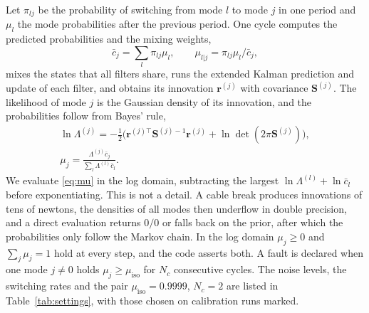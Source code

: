 \documentclass[a4paper,fleqn]{cas-dc}
\newcommand{\vc}[1]{\bm{#1}}
\newcommand{\mt}[1]{\mathbf{#1}}
\begin{document}
Let $\pi_{lj}$ be the probability of switching from mode $l$ to mode $j$ in one period and $\mu_l$ the mode probabilities after the previous period. One cycle computes the predicted probabilities and the mixing weights,
\begin{equation}\label{eq:mix}
\bar c_j=\sum_l\pi_{lj}\mu_l,\qquad\mu_{l|j}=\pi_{lj}\mu_l/\bar c_j,
\end{equation}
mixes the states that all filters share, runs the extended Kalman prediction and update of each filter, and obtains its innovation $\vc r^{(j)}$ with covariance $\mt S^{(j)}$. The likelihood of mode $j$ is the Gaussian density of its innovation, and the probabilities follow from Bayes' rule,
\begin{equation}\label{eq:mu}
\begin{gathered}
\ln\Lambda^{(j)}=-\tfrac12\big(\vc r^{(j)\top}\mt S^{(j)-1}\vc r^{(j)}+\ln\det(2\pi\mt S^{(j)})\big),\\
\mu_j=\frac{\Lambda^{(j)}\bar c_j}{\sum_l\Lambda^{(l)}\bar c_l}.
\end{gathered}
\end{equation}
We evaluate \eqref{eq:mu} in the log domain, subtracting the largest $\ln\Lambda^{(l)}+\ln\bar c_l$ before exponentiating. This is not a detail. A cable break produces innovations of tens of newtons, the densities of all modes then underflow in double precision, and a direct evaluation returns $0/0$ or falls back on the prior, after which the probabilities only follow the Markov chain. In the log domain $\mu_j\ge0$ and $\sum_j\mu_j=1$ hold at every step, and the code asserts both. A fault is declared when one mode $j\ne0$ holds $\mu_j\ge\mu_{\mathrm{iso}}$ for $N_c$ consecutive cycles. The noise levels, the switching rates and the pair $\mu_{\mathrm{iso}}=0.9999$, $N_c=2$ are listed in Table~\ref{tab:settings}, with those chosen on calibration runs marked.
\end{document}
